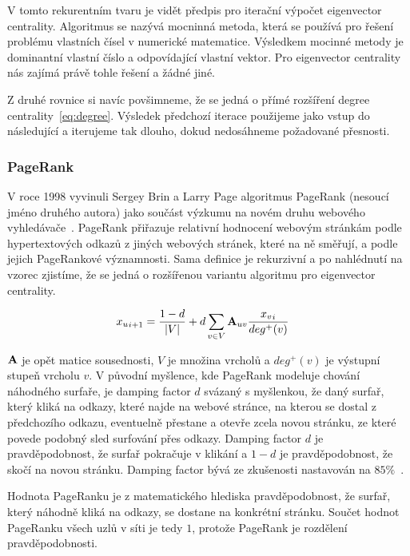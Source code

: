\documentclass{bakalarka}
\begin{document}
V tomto rekurentním tvaru je vidět předpis pro iterační výpočet eigenvector
centrality. Algoritmus se nazývá mocninná metoda, která se používá pro řešení
problému vlastních čísel v numerické matematice. Výsledkem mocinné metody je
dominantní vlastní číslo a odpovídající vlastní vektor. Pro eigenvector
centrality nás zajímá právě tohle řešení a žádné jiné.

Z druhé rovnice si navíc povšimneme, že se jedná o přímé rozšíření degree
centrality~\eqref{eq:degree}. Výsledek předchozí iterace použijeme jako vstup
do následující a iterujeme tak dlouho, dokud nedosáhneme požadované přesnosti.

\subsubsection{PageRank}
V roce 1998 vyvinuli Sergey Brin a Larry Page algoritmus PageRank (nesoucí
jméno druhého autora) jako součást výzkumu na novém druhu webového
vyhledávače~\citep{pagerankoriginal,visemalseed2005,page1997}. PageRank
přiřazuje relativní hodnocení webovým stránkám podle hypertextových odkazů z
jiných webových stránek, které na ně směřují, a podle jejich PageRankové
významnosti. Sama definice je rekurzivní a po nahlédnutí na vzorec zjistíme, že
se jedná o rozšířenou variantu algoritmu pro eigenvector centrality.

\begin{align*}
{x_u}_{i + 1} &= \frac{1 - d}{|V|} + d \displaystyle\sum_{v \in V} {\bf A}_{uv}
\frac{{x_v}_{i}}{deg^+ (v)}
\end{align*}

${\bf A}$ je opět matice sousednosti, $V$ je množina vrcholů a $deg^+(v)$ je
výstupní stupeň vrcholu $v$. V původní myšlence, kde PageRank modeluje chování
náhodného surfaře, je damping factor $d$ svázaný s myšlenkou, že daný surfař,
který kliká na odkazy, které najde na webové stránce, na kterou se dostal z
předchozího odkazu, eventuelně přestane a otevře zcela novou stránku, ze které
povede podobný sled surfování přes odkazy. Damping factor $d$ je
pravděpodobnost, že surfař pokračuje v klikání a $1 - d$ je pravděpodobnost, že
skočí na novou stránku. Damping factor bývá ze zkušenosti nastavován na
$85\%$~\citep{pagerankoriginal}.

Hodnota PageRanku je z matematického hlediska pravděpodobnost, že surfař, který
náhodně kliká na odkazy, se dostane na konkrétní stránku. Součet hodnot
PageRanku všech uzlů v síti je tedy $1$, protože PageRank je rozdělení
pravděpodobnosti.
\end{document}
